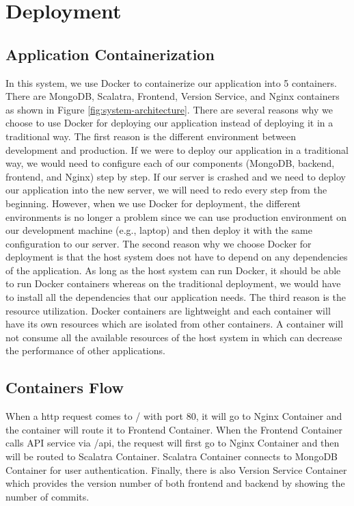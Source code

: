 \chapter{Deployment}

\section{Application Containerization}
    In this system, we use Docker\cite{docker} to containerize our application into 5 containers. There are MongoDB, Scalatra, Frontend, Version Service, and Nginx containers as shown in Figure \ref{fig:system-architecture}. There are several reasons why we choose to use Docker for deploying our application instead of deploying it in a traditional way. The first reason is the different environment between development and production. If we were to deploy our application in a traditional way, we would need to configure each of our components (MongoDB, backend, frontend, and Nginx) step by step. If our server is crashed and we need to deploy our application into the new server, we will need to redo every step from the beginning. However, when we use Docker for deployment, the different environments is no longer a problem since we can use production environment on our development machine (e.g., laptop) and then deploy it with the same configuration to our server. The  second reason why we choose Docker for deployment is that the host system does not have to depend on any dependencies of the application. As long as the host system can run Docker, it should be able to run Docker containers whereas on the traditional deployment, we would have to install all the dependencies that our application needs. The third reason is the resource utilization. Docker containers are lightweight and each container will have its own resources which are isolated from other containers. A container will not consume all the available resources of the host system in which can decrease the performance of other applications.
    
    \newpage
    \section{Containers Flow}
        When a http request comes to / with port 80, it will go to Nginx Container and the container will route it to Frontend Container. When the Frontend Container calls API service via /api, the request will first go to Nginx Container and then will be routed to Scalatra Container. Scalatra Container connects to MongoDB Container for user authentication. Finally, there is also Version Service Container which provides the version number of both frontend and backend by showing the number of commits.
        

